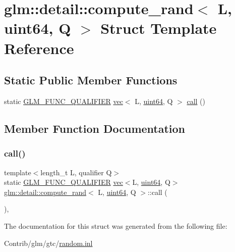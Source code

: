 \hypertarget{structglm_1_1detail_1_1compute__rand_3_01_l_00_01uint64_00_01_q_01_4}{}\section{glm\+:\+:detail\+:\+:compute\+\_\+rand$<$ L, uint64, Q $>$ Struct Template Reference}
\label{structglm_1_1detail_1_1compute__rand_3_01_l_00_01uint64_00_01_q_01_4}
\subsection*{Static Public Member Functions}
\begin{DoxyCompactItemize}
\item 
static \mbox{\hyperlink{setup_8hpp_a33fdea6f91c5f834105f7415e2a64407}{G\+L\+M\+\_\+\+F\+U\+N\+C\+\_\+\+Q\+U\+A\+L\+I\+F\+I\+ER}} \mbox{\hyperlink{structglm_1_1vec}{vec}}$<$ L, \mbox{\hyperlink{namespaceglm_1_1detail_adec4b19bf4982125e122db2fe03c5810}{uint64}}, Q $>$ \mbox{\hyperlink{structglm_1_1detail_1_1compute__rand_3_01_l_00_01uint64_00_01_q_01_4_a2191af23ff15cf401dcc9219cb012723}{call}} ()
\end{DoxyCompactItemize}


\subsection{Member Function Documentation}
\mbox{\label{structglm_1_1detail_1_1compute__rand_3_01_l_00_01uint64_00_01_q_01_4_a2191af23ff15cf401dcc9219cb012723}} 
\subsubsection{\texorpdfstring{call()}{call()}}
{\footnotesize\ttfamily template$<$length\+\_\+t L, qualifier Q$>$ \\
static \mbox{\hyperlink{setup_8hpp_a33fdea6f91c5f834105f7415e2a64407}{G\+L\+M\+\_\+\+F\+U\+N\+C\+\_\+\+Q\+U\+A\+L\+I\+F\+I\+ER}} \mbox{\hyperlink{structglm_1_1vec}{vec}}$<$L, \mbox{\hyperlink{namespaceglm_1_1detail_adec4b19bf4982125e122db2fe03c5810}{uint64}}, Q$>$ \mbox{\hyperlink{structglm_1_1detail_1_1compute__rand}{glm\+::detail\+::compute\+\_\+rand}}$<$ L, \mbox{\hyperlink{namespaceglm_1_1detail_adec4b19bf4982125e122db2fe03c5810}{uint64}}, Q $>$\+::call (\begin{DoxyParamCaption}{ }\end{DoxyParamCaption})\hspace{0.3cm}{\ttfamily [inline]}, {\ttfamily [static]}}



The documentation for this struct was generated from the following file\+:\begin{DoxyCompactItemize}
\item 
Contrib/glm/gtc/\mbox{\hyperlink{random_8inl}{random.\+inl}}\end{DoxyCompactItemize}
